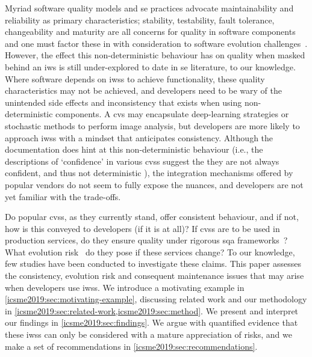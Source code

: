 Myriad software quality models and \gls{se} practices advocate maintainability and reliability as primary characteristics; stability, testability, fault tolerance, changeability and maturity are all concerns for quality in software components~\citep{Pressman:2005vf,Sommerville:2011uc,Horch:2003uv} and one must factor these in with consideration to software evolution challenges~\citep{demeyer2008software,4659256,tu2000evolution,1572302,THOMAS2014457}. However, the effect this non-deterministic behaviour has on quality when masked behind  an \gls{iws} is still under-explored to date in \gls{se} literature, to our knowledge. Where software depends on \glspl{iws} to achieve functionality, these quality characteristics may not be achieved, and developers need to be wary of the unintended side effects and inconsistency that exists when using non-deterministic components. A \gls{cvs} may encapsulate deep-learning strategies or stochastic methods to perform image analysis, but developers are more likely to approach \glspl{iws} with a mindset that anticipates consistency. Although the documentation does hint at this non-deterministic behaviour (i.e., the descriptions of `confidence' in various \glspl{cvs} suggest the they are not always confident, and thus not deterministic  ), the integration mechanisms offered by popular vendors do not seem to fully expose the nuances, and developers are not yet familiar with the trade-offs.

Do popular \glspl{cvs}, as they currently stand, offer consistent behaviour, and if not, how is this conveyed to developers (if it is at all)? If \glspl{cvs} are to be used in production services, do they ensure quality under rigorous \gls{sqa} frameworks~\citep{Horch:2003uv}? What evolution risk~\citep{demeyer2008software,4659256,tu2000evolution,1572302} do they pose if these services change?
To our knowledge, few studies have been conducted to investigate these claims. This paper assesses the consistency, evolution risk and consequent maintenance issues that may arise when developers use \glspl{iws}. We introduce a motivating example in \cref{icsme2019:sec:motivating-example}, discussing related work and our methodology in \cref{icsme2019:sec:related-work,icsme2019:sec:method}. We present and interpret our findings in \cref{icsme2019:sec:findings}. We argue with quantified evidence that these \glspl{iws} can only be considered with a mature appreciation of risks, and we make a set of recommendations in \cref{icsme2019:sec:recommendations}.

